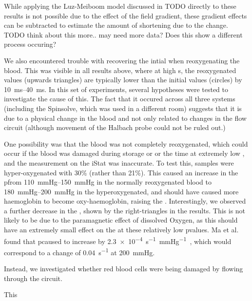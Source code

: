 While applying the Luz-Meiboom model discussed in TODO directly to these results is not possible due to the effect of the field gradient, these gradient effects can be subtracted to estimate the amount of \Ttwo shortening due to the \SOtwo change.
TODO think about this more.. may need more data? Does this show a different process occuring?

We also encountered trouble with recovering the intial \Ttwo when reoxygenating the blood.
This was visible in all results above, where at high \SOtwo{}s, the reoxygenated \Ttwo values (upwards triangles)  are typically lower than the initial values (circles) by \SIrange{10}{40}{ms}.
In this set of experiments, several hypotheses were tested to investigate the cause of this.
The fact that it occured across all three systems (including the Spinsolve, which was used in a different room) suggests that it is due to a physical change in the blood and not only related to changes in the flow circuit (although movement of the Halbach probe could not be ruled out.)

One possibility was that the blood was not completely reoxygenated, which could occur if the blood was damaged during storage or or the time at extremely low \SOtwo, and the \SOtwo measurement on the iStat was inaccurate.
To test this, samples were hyper-oxygenated with 30\% \Otwo (rather than 21\%).
This caused an increase in the p\Otwo from \SIrange{110}{150}{mmHg} in the normally reoxygenated blood to \SIrange{180}{200}{mmHg} in the hyperoxygenated, and should have caused more haemoglobin to become oxy-haemoglobin, raising the \Ttwo.
Interestingly, we observed a further decrease in the \Ttwo, shown by the right-triangles in the results.
This is not likely to be due to the paramagnetic effect of dissolved Oxygen, as this should have an extremely small effect on the \Ttwo at these relatively low p\Otwo values.
Ma et al. found that p\Otwo caused \Rtwo to increase by \SI{2.3e-4}{s^{-1}\per\mmHg}~\cite{Maeffectdissolvedoxygen2016}, which would correspond to a change of \SI{0.04}{s^{-1}} at \SI{200}{mmHg}.

Instead, we investigated whether red blood cells were being damaged by flowing through the circuit.

This

